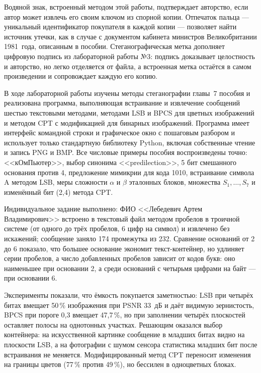 \documentclass[14pt,a4paper]{extarticle}
\begin{document}
Водяной знак, встроенный методом этой работы, подтверждает авторство, если автор
может извлечь его своим ключом из спорной копии. Отпечаток пальца --- уникальный
идентификатор покупателя в каждой копии --- позволяет найти источник утечки, как в
случае с документом кабинета министров Великобритании 1981~года, описанным в пособии.
Стеганографическая метка дополняет цифровую подпись из лабораторной работы №3: подпись
доказывает целостность и авторство, но легко отделяется от файла, а встроенная метка
остаётся в самом произведении и сопровождает каждую его копию.


В ходе лабораторной работы изучены методы стеганографии главы~7 пособия и реализована
программа, выполняющая встраивание и извлечение сообщений шестью текстовыми методами,
методами LSB и BPCS для цветных изображений и методом CPT с модификацией для
бинарных изображений. Программа имеет интерфейс командной строки и графическое окно с
пошаговым разбором и использует только стандартную библиотеку Python, включая
собственные чтение и запись PNG и BMP. Все числовые примеры пособия воспроизведены
точно: <<кОмПьютер>>, выбор синонима <<predilection>>, 5 бит смешанного основания
против 4, предложение мимикрии для кода 1010, встраивание символа A методом LSB,
меры сложности $\alpha$ и $\beta$ эталонных блоков, множества $S_1, \ldots, S_7$ и
изменённый бит (2,4) метода CPT.

Индивидуальное задание выполнено: ФИО <<Лебедевич Артем Владимирович>> встроено в
текстовый файл методом пробелов в троичной системе (от одного до трёх пробелов, 6
цифр на символ) и извлечено без искажений; сообщение заняло 174 промежутка из 232.
Сравнение оснований от 2 до 6 показало, что большее основание экономит текст-контейнер,
но удлиняет серии пробелов, а число добавленных пробелов зависит от кодов букв:
оно наименьшее при основании 2, а среди оснований с четырьмя цифрами на байт --- при
основании 6.

Эксперименты показали, что ёмкость покупается заметностью: LSB при четырёх битах
вмещает 50\,\% изображения при PSNR 33~дБ и даёт видимую зернистость, BPCS при
пороге 0,3 вмещает 47,7\,\%, но при заполнении четырёх плоскостей оставляет полосы на
однотонных участках. Решающим оказался выбор контейнера: на искусственной картинке
сообщение в младших битах видно на плоскости LSB, а на фотографии с шумом сенсора
статистика младших бит после встраивания не меняется. Модифицированный метод CPT
переносит изменения на границы цветов (77\,\% против 49\,\%), но бессилен в
одноцветных блоках.
\end{document}
